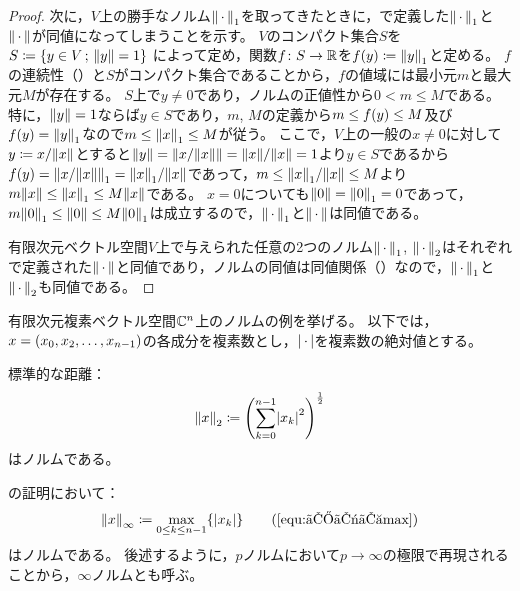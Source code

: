 \documentclass[b5paper,oneside,openany]{ltjsbook} %
\begin{document}
\begin{thm}
\begin{proof}
        次に，$V$上の勝手なノルム$\norm{\dummy}_1$を取ってきたときに，で定義した$\norm{\dummy}_1$と$\norm{\dummy}$が同値になってしまうことを示す。
        $V$のコンパクト集合$S$を$S\coloneqq \sset{y\in V}{\norm{y}=1}$
        によって定め，関数$f\colon S\to \mathbb{R}$を$\fun{f}{y}\coloneqq \norm{y}_1$と定める。
        $f$の連続性（）と$S$がコンパクト集合であることから，$f$の値域には最小元$m$と最大元$M$が存在する。
        $S$上で$y\ne {0}$であり，ノルムの正値性から$0<m\leq M$である。
        特に，$\norm{y}=1$ならば$y\in S$であり，$m$, $M$の定義から$m\leq \fun{f}{y}\leq M$及び$\fun{f}{y}=\norm{y}_1$なので$m\leq \norm{x}_1\leq M$が従う。
        ここで，$V$上の一般の$x\ne 0$に対して$y\coloneqq x / \norm{x}$とすると$\norm{y}=\norm{x/\norm{x}}=\norm{x}/\norm{x}=1$より$y\in S$であるから$\fun{f}{y}=\norm{x/\norm{x}}_1=\norm{x}_1/\norm{x}$であって，$m\leq \norm{x}_1/\norm{x}\leq M$より$m\norm{x}\leq \norm{x}_1\leq M\norm{x}$である。
        $x=0$についても$\norm{0}=\norm{0}_1=0$であって，$m \norm{0}_1\leq \norm{0}\leq M\norm{0}_1$は成立するので，$\norm{\dummy}_1$と$\norm{\dummy}$は同値である。

        有限次元ベクトル空間$V$上で与えられた任意の2つのノルム$\norm{\dummy}_1$, $\norm{\dummy}_2$はそれぞれで定義された$\norm{\dummy}$と同値であり，ノルムの同値は同値関係（）なので，$\norm{\dummy}_1$と$\norm{\dummy}_2$も同値である。
    \end{proof}
\end{thm}

有限次元複素ベクトル空間$\mathbb{C}^n$上のノルムの例を挙げる。
以下では，$x=\pare{x_0,x_2,\dots,x_{n-1}}$の各成分を複素数とし，$\abs{\dummy}$を複素数の絶対値とする。

\begin{eg}[Euclidノルム]
    標準的な距離：
    \begin{equation}
        \norm{x}_2\coloneqq \pare{\sum_{k=0}^{n-1} \abs{x_k}^2}^{\frac{1}{2}}
    \end{equation}
    はノルムである。
\end{eg}

\begin{eg}[一様ノルム]
    の証明において：
    \begin{equation}
        \norm{x}_\infty \coloneqq \max_{0\leq k\leq n-1}\bra{\abs{x_k}}
        \tag{\ref{equ:ノルムmax}}
    \end{equation}
    はノルムである。
    後述するように，$p$ノルムにおいて$p\to\infty$の極限で再現されることから，$\infty$ノルムとも呼ぶ。
\end{eg}
\end{document}
